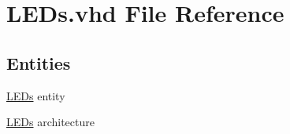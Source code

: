 \hypertarget{_l_e_ds_8vhd}{}\section{L\+E\+Ds.\+vhd File Reference}
\label{_l_e_ds_8vhd}
\subsection*{Entities}
\begin{DoxyCompactItemize}
\item 
\hyperlink{class_l_e_ds}{L\+E\+Ds} entity
\item 
\hyperlink{class_l_e_ds_1_1_l_e_ds}{L\+E\+Ds} architecture
\end{DoxyCompactItemize}
